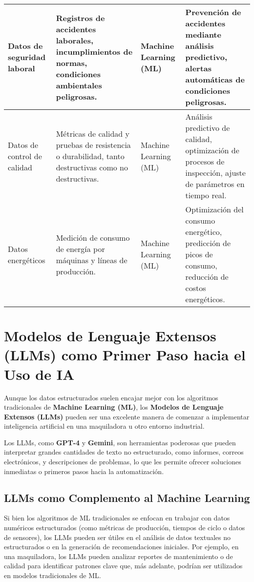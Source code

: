 \begin{table}[htbp]
\begin{tabularx}{\textwidth}{|X|X|X|X|}
\hline
Datos de seguridad laboral & Registros de accidentes laborales, incumplimientos de normas, condiciones ambientales peligrosas. & Machine Learning (ML) & Prevención de accidentes mediante análisis predictivo, alertas automáticas de condiciones peligrosas. \\
\hline
Datos de control de calidad & Métricas de calidad y pruebas de resistencia o durabilidad, tanto destructivas como no destructivas. & Machine Learning (ML) & Análisis predictivo de calidad, optimización de procesos de inspección, ajuste de parámetros en tiempo real. \\
\hline
Datos energéticos & Medición de consumo de energía por máquinas y líneas de producción. & Machine Learning (ML) & Optimización del consumo energético, predicción de picos de consumo, reducción de costos energéticos. \\
\hline
\end{tabularx}
\label{tab:responsive-table}
\end{table}

\section{Modelos de Lenguaje Extensos (LLMs) como Primer Paso hacia el Uso de IA}\label{llms-primer-paso-ia}

Aunque los datos estructurados suelen encajar mejor con los algoritmos tradicionales de \textbf{Machine Learning (ML)}, los \textbf{Modelos de Lenguaje Extensos (LLMs)} pueden ser una excelente manera de comenzar a implementar inteligencia artificial en una maquiladora u otro entorno industrial.

Los LLMs, como \textbf{GPT-4} y \textbf{Gemini}, son herramientas poderosas que pueden interpretar grandes cantidades de texto no estructurado, como informes, correos electrónicos, y descripciones de problemas, lo que les permite ofrecer soluciones inmediatas o primeros pasos hacia la automatización.

\subsection{LLMs como Complemento al Machine Learning}
Si bien los algoritmos de ML tradicionales se enfocan en trabajar con datos numéricos estructurados (como métricas de producción, tiempos de ciclo o datos de sensores), los LLMs pueden ser útiles en el análisis de datos textuales no estructurados o en la generación de recomendaciones iniciales. Por ejemplo, en una maquiladora, los LLMs pueden analizar reportes de mantenimiento o de calidad para identificar patrones clave que, más adelante, podrían ser utilizados en modelos tradicionales de ML.

